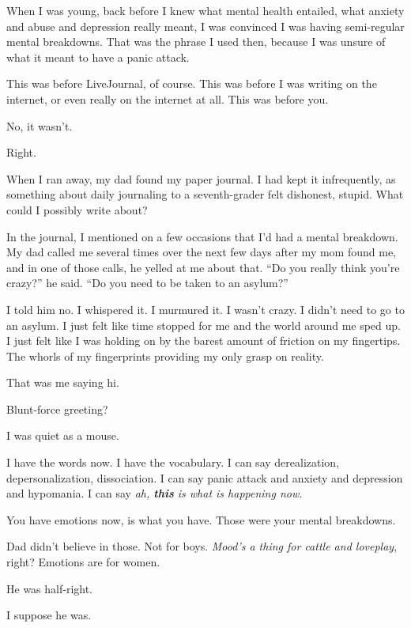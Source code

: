 \noindent When I was young, back before I knew what mental health entailed, what anxiety and abuse and depression really meant, I was convinced I was having semi-regular mental breakdowns. That was the phrase I used then, because I was unsure of what it meant to have a panic attack.

This was before LiveJournal, of course. This was before I was writing on the internet, or even really on the internet at all. This was before you.

\begin{ally}
No, it wasn't.
\end{ally}
Right.

When I ran away, my dad found my paper journal. I had kept it infrequently, as something about daily journaling to a seventh-grader felt dishonest, stupid. What could I possibly write about?

In the journal, I mentioned on a few occasions that I'd had a mental breakdown. My dad called me several times over the next few days after my mom found me, and in one of those calls, he yelled at me about that. ``Do you really think you're crazy?'' he said. ``Do you need to be taken to an asylum?''

I told him no. I whispered it. I murmured it. I wasn't crazy. I didn't need to go to an asylum. I just felt like time stopped for me and the world around me sped up. I just felt like I was holding on by the barest amount of friction on my fingertips. The whorls of my fingerprints providing my only grasp on reality.

\begin{ally}
That was me saying hi.
\end{ally}
Blunt-force greeting?

\begin{ally}
I was quiet as a mouse.
\end{ally}
I have the words now. I have the vocabulary. I can say derealization, depersonalization, dissociation. I can say panic attack and anxiety and depression and hypomania. I can say \emph{ah, \textbf{this} is what is happening now}.

\begin{ally}
You have emotions now, is what you have. Those were your mental breakdowns.
\end{ally}
Dad didn't believe in those. Not for boys. \emph{Mood's a thing for cattle and loveplay}, right? Emotions are for women.

\begin{ally}
He was half-right.
\end{ally}
I suppose he was.

\newpage
